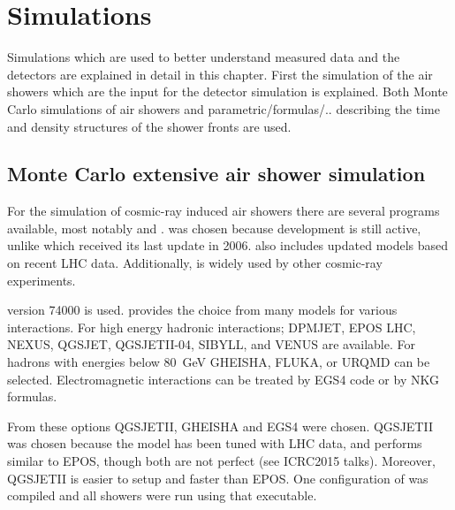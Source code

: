 \chapter{Simulations}
\label{ch:simulations}

Simulations which are used to better understand measured data and the
detectors are explained in detail in this chapter. First the simulation
of the air showers which are the input for the detector simulation is
explained. Both Monte Carlo simulations of air showers and
parametric/formulas/.. describing the time and density structures of the
shower fronts are used.


\section{Monte Carlo extensive air shower simulation}

For the simulation of cosmic-ray induced air showers there are several
programs available, most notably \corsika and \aires\cite{sciutto1999}.
\corsika was chosen because development is still active, unlike
\aires which received its last update in 2006. \corsika also includes
updated models based on recent LHC data. Additionally, \corsika is widely
used by other cosmic-ray experiments.

\corsika version 74000 is used. \corsika provides the choice from many
models for various interactions. For high energy hadronic interactions;
DPMJET, EPOS LHC\cite{pierog2013}, NEXUS, QGSJET,
QGSJETII-04\cite{ostapchenko2013}, SIBYLL, and VENUS are available. For
hadrons with energies below \SI{80}{\GeV}
GHEISHA\cite{fesefeldt1985}, FLUKA, or URQMD can be selected.
Electromagnetic interactions can be treated by EGS4\cite{egs4} code or
by NKG formulas.

From these options QGSJETII, GHEISHA and EGS4 were chosen. QGSJETII was chosen
because the model has been tuned with LHC data, and performs similar to EPOS, though
both are not perfect (see ICRC2015 talks). Moreover, QGSJETII is easier to
setup and faster than EPOS. One configuration of \corsika was compiled and all
showers were run using that executable.

%
%


